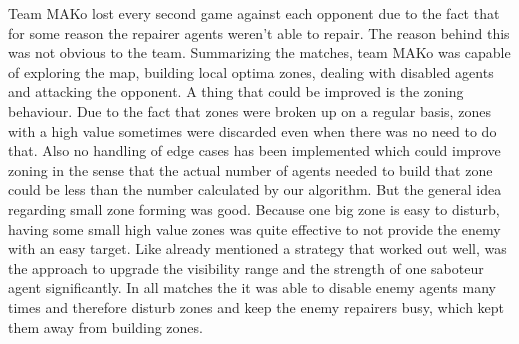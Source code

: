 Team MAKo lost every second game against each opponent due to the fact that for some reason the repairer agents weren't able to repair.
The reason behind this was not obvious to the team.
Summarizing the matches, team MAKo was capable of exploring the map, building local optima zones, dealing with disabled agents and attacking the opponent.
A thing that could be improved is the zoning behaviour.
Due to the fact that zones were broken up on a regular basis, zones with a high value sometimes were discarded even when there was no need to do that.
Also no handling of edge cases has been implemented which could improve zoning in the sense that the actual number of agents needed to build that zone could be less than the number calculated by our algorithm.
But the general idea regarding small zone forming was good.
Because one big zone is easy to disturb, having some small high value zones was quite effective to not provide the enemy with an easy target.
Like already mentioned a strategy that worked out well, was the approach to upgrade the visibility range and the strength of one saboteur agent significantly.
In all matches the it was able to disable enemy agents many times and therefore disturb zones and keep the enemy repairers busy, which kept them away from building zones.

